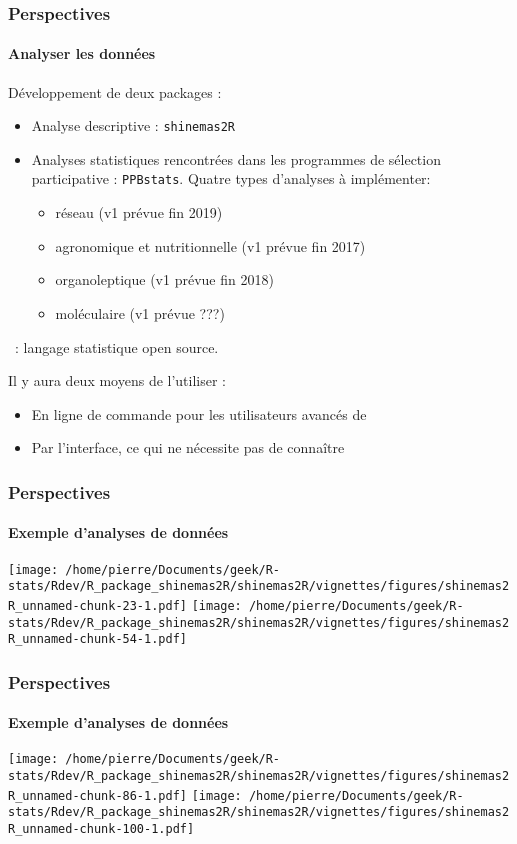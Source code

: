 \begin{frame}
\frametitle{Perspectives}
\framesubtitle{Analyser les données}

Développement de deux packages \R: 
\begin{itemize}
\item Analyse descriptive : \texttt{shinemas2R}
\item Analyses statistiques rencontrées dans les programmes de sélection participative : \texttt{PPBstats}.
Quatre types d'analyses à implémenter:
\begin{itemize}
\item réseau (v1 prévue fin 2019)
\item agronomique et nutritionnelle (v1 prévue fin 2017)
\item organoleptique  (v1 prévue fin 2018)
\item moléculaire  (v1 prévue ???)
\end{itemize}

\end{itemize}

\vfill 

\R~: langage statistique open source. 

\vfill 

Il y aura deux moyens de l'utiliser : 
\begin{itemize}
\item En ligne de commande pour les utilisateurs avancés de \R
\item Par l'interface, ce qui ne nécessite pas de connaître \R
\end{itemize}

\end{frame}



\begin{frame}
\frametitle{Perspectives}
\framesubtitle{Exemple d'analyses de données}
\begin{center}
\texttt{[image: /home/pierre/Documents/geek/R-stats/Rdev/R\_package\_shinemas2R/shinemas2R/vignettes/figures/shinemas2R\_unnamed-chunk-23-1.pdf]}
\hfill
\texttt{[image: /home/pierre/Documents/geek/R-stats/Rdev/R\_package\_shinemas2R/shinemas2R/vignettes/figures/shinemas2R\_unnamed-chunk-54-1.pdf]}
\end{center}
\end{frame}


\begin{frame}
\frametitle{Perspectives}
\framesubtitle{Exemple d'analyses de données}
\begin{center}
\texttt{[image: /home/pierre/Documents/geek/R-stats/Rdev/R\_package\_shinemas2R/shinemas2R/vignettes/figures/shinemas2R\_unnamed-chunk-86-1.pdf]}
\hfill
\texttt{[image: /home/pierre/Documents/geek/R-stats/Rdev/R\_package\_shinemas2R/shinemas2R/vignettes/figures/shinemas2R\_unnamed-chunk-100-1.pdf]}
\end{center}
\end{frame}


